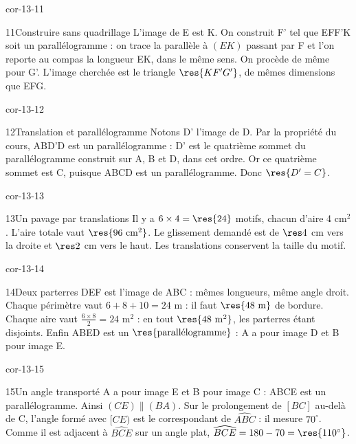 \begin{blocLivre}{cor-13-11}\begin{corrige}{11}{Construire sans quadrillage}
L’image de E est K. On construit F’ tel que EFF’K soit un parallélogramme : on trace la parallèle à $(EK)$ passant par F et l’on reporte au compas la longueur EK, dans le même sens. On procède de même pour G’. L’image cherchée est le triangle $\res{KF'G'}$, de mêmes dimensions que EFG.
\label{fig-cor-13-11}
\end{corrige}\end{blocLivre}
\begin{blocLivre}{cor-13-12}\begin{corrige}{12}{Translation et parallélogramme}
Notons D’ l’image de D. Par la propriété du cours, ABD’D est un parallélogramme : D’ est le quatrième sommet du parallélogramme construit sur A, B et D, dans cet ordre. Or ce quatrième sommet est C, puisque ABCD est un parallélogramme. Donc $\res{D'=C}$.
\label{fig-cor-13-12}
\end{corrige}\end{blocLivre}
\begin{blocLivre}{cor-13-13}\begin{corrige}{13}{Un pavage par translations}
Il y a $6\times4=\res{24}$ motifs, chacun d’aire 4 cm$^2$. L’aire totale vaut $\res{96\ \mathrm{cm}^2}$. Le glissement demandé est de $\res4$ cm vers la droite et $\res2$ cm vers le haut. Les translations conservent la taille du motif.
\label{fig-cor-13-13}
\end{corrige}\end{blocLivre}
\begin{blocLivre}{cor-13-14}\begin{corrige}{14}{Deux parterres}
DEF est l’image de ABC : mêmes longueurs, même angle droit. Chaque périmètre vaut $6+8+10=24$ m : il faut $\res{48\ \mathrm m}$ de bordure. Chaque aire vaut $\frac{6\times8}2=24$ m$^2$ : en tout $\res{48\ \mathrm m^2}$, les parterres étant disjoints. Enfin ABED est un $\res{\text{parallélogramme}}$ : A a pour image D et B pour image E.
\label{fig-cor-13-14}
\end{corrige}\end{blocLivre}
\begin{blocLivre}{cor-13-15}\begin{corrige}{15}{Un angle transporté}
A a pour image E et B pour image C : ABCE est un parallélogramme. Ainsi $(CE)\parallel(BA)$. Sur le prolongement de $[BC]$ au-delà de C, l’angle formé avec $[CE)$ est le correspondant de $\widehat{ABC}$ : il mesure $70^\circ$. Comme il est adjacent à $\widehat{BCE}$ sur un angle plat, $\widehat{BCE}=180-70=\res{110^\circ}$.
\label{fig-cor-13-15}
\end{corrige}\end{blocLivre}
